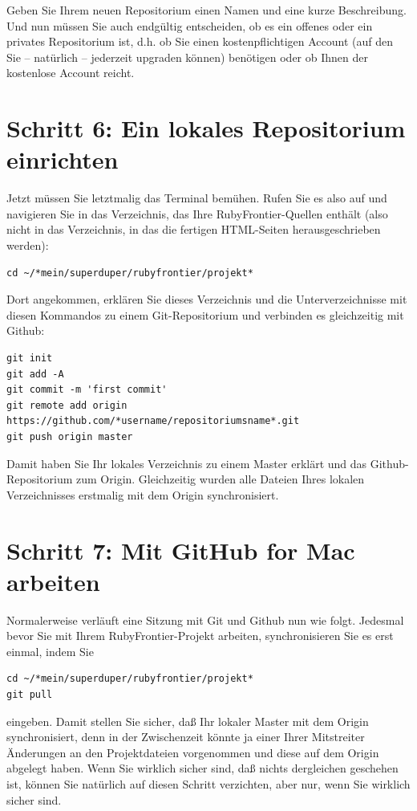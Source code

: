 \documentclass[11pt]{report}
\begin{document}
Geben Sie Ihrem neuen Repositorium einen Namen und eine kurze
Beschreibung. Und nun müssen Sie auch endgültig entscheiden, ob es ein
offenes oder ein privates Repositorium ist, d.h. ob Sie einen
kostenpflichtigen Account (auf den Sie – natürlich – jederzeit
upgraden können) benötigen oder ob Ihnen der kostenlose Account
reicht.
\section{Schritt 6: Ein lokales Repositorium einrichten}
\label{sec-2-11-6}


Jetzt müssen Sie letztmalig das Terminal bemühen. Rufen Sie es also
auf und navigieren Sie in das Verzeichnis, das Ihre
RubyFrontier-Quellen enthält (also nicht in das Verzeichnis, in das
die fertigen HTML-Seiten herausgeschrieben werden):


\begin{verbatim}
cd ~/*mein/superduper/rubyfrontier/projekt*
\end{verbatim}

Dort angekommen, erklären Sie dieses Verzeichnis und die
Unterverzeichnisse mit diesen Kommandos zu einem Git-Repositorium und
verbinden es gleichzeitig mit Github:


\begin{verbatim}
git init
git add -A
git commit -m 'first commit'
git remote add origin https://github.com/*username/repositoriumsname*.git
git push origin master
\end{verbatim}

Damit haben Sie Ihr lokales Verzeichnis zu einem Master erklärt und
das Github-Repositorium zum Origin. Gleichzeitig wurden alle Dateien
Ihres lokalen Verzeichnisses erstmalig mit dem Origin synchronisiert.
\section{Schritt 7: Mit GitHub for Mac arbeiten}
\label{sec-2-11-7}


Normalerweise verläuft eine Sitzung mit Git und Github nun wie
folgt. Jedesmal bevor Sie mit Ihrem RubyFrontier-Projekt arbeiten,
synchronisieren Sie es erst einmal, indem Sie


\begin{verbatim}
cd ~/*mein/superduper/rubyfrontier/projekt*
git pull
\end{verbatim}

eingeben. Damit stellen Sie sicher, daß Ihr lokaler Master mit dem
Origin synchronisiert, denn in der Zwischenzeit könnte ja einer Ihrer
Mitstreiter Änderungen an den Projektdateien vorgenommen und diese auf
dem Origin abgelegt haben. Wenn Sie wirklich sicher sind, daß nichts
dergleichen geschehen ist, können Sie natürlich auf diesen Schritt
verzichten, aber nur, wenn Sie wirklich sicher sind.
\end{document}

